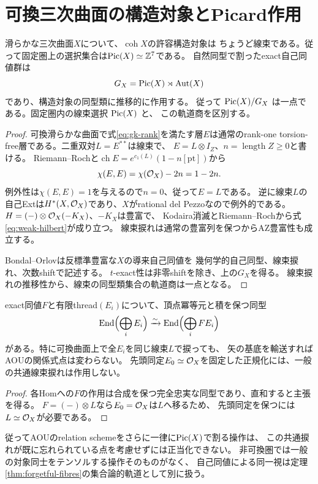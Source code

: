 \section{可換三次曲面の構造対象とPicard作用}
\begin{theorem}[可換基準模型]\label{thm:commutative-structure}
滑らかな三次曲面$X$について、$\operatorname{coh}X$の許容構造対象は
ちょうど線束である。従って固定圏上の選択集合は$\operatorname{Pic}(X)\simeq\mathbb Z^7$である。
自然同型で割ったexact自己同値群は
\[
 G_X=\operatorname{Pic}(X)\rtimes\operatorname{Aut}(X)
\]
であり、構造対象の同型類に推移的に作用する。
従って $\operatorname{Pic}(X)/G_X$ は一点である。固定圏内の線束選択 $\operatorname{Pic}(X)$ と、
この軌道商を区別する。
\end{theorem}
\begin{proof}
可換滑らかな曲面で式\eqref{eq:gk-rank}を満たす層$E$は通常のrank-one
 torsion-free層である。二重双対$L=E^{**}$は線束で、
$E=L\otimes I_Z$、$n=\operatorname{length}Z\ge0$と書ける。
Riemann--Rochと$\operatorname{ch}E=e^{c_1(L)}(1-n[\mathrm{pt}])$から
\[
 \chi(E,E)=\chi(\mathcal O_X)-2n=1-2n.
\]
例外性は$\chi(E,E)=1$を与えるので$n=0$、従って$E=L$である。
逆に線束$L$の自己Extは$H^*(X,\mathcal O_X)$であり、$X$がrational del Pezzoなので例外的である。
$H=(-)\otimes\mathcal O_X(-K_X)$、$-K_X$は豊富で、
Kodaira消滅とRiemann--Rochから式\eqref{eq:weak-hilbert}が成り立つ。
線束捩れは通常の豊富列を保つからAZ豊富性も成立する。

Bondal--Orlov\cite[Theorem 3.1]{BO}は反標準豊富な$X$の導来自己同値を
幾何学的自己同型、線束捩れ、次数shiftで記述する。
$t$-exact性は非零shiftを除き、上の$G_X$を得る。
線束捩れの推移性から、線束の同型類集合の軌道商は一点となる。
\end{proof}

\begin{proposition}[共通線束捩れはrelation表示に見えない]\label{prop:common-tensor}
exact同値$F$と有限thread$(E_i)$について、頂点冪等元と積を保つ同型
\[
 \operatorname{End}\Bigl(\bigoplus_iE_i\Bigr)
 \xrightarrow{\sim}\operatorname{End}\Bigl(\bigoplus_iFE_i\Bigr)
\]
がある。特に可換曲面上で全$E_i$を同じ線束$L$で捩っても、
矢の基底を輸送すればAOUの関係式点は変わらない。
先頭同定$E_0\simeq\mathcal O_X$を固定した正規化には、一般の共通線束捩れは作用しない。
\end{proposition}
\begin{proof}
各Homへの$F$の作用は合成を保つ完全忠実な同型であり、直和すると主張を得る。
$F=(-)\otimes L$なら$E_0=\mathcal O_X$は$L$へ移るため、
先頭同定を保つには$L\simeq\mathcal O_X$が必要である。
\end{proof}
従ってAOUのrelation schemeをさらに一律に$\operatorname{Pic}(X)$で割る操作は、
この共通捩れが既に忘れられている点を考慮せずには正当化できない。
非可換圏では一般の対象同士をテンソルする操作そのものがなく、
自己同値による同一視は定理\ref{thm:forgetful-fibres}の集合論的軌道として別に扱う。

